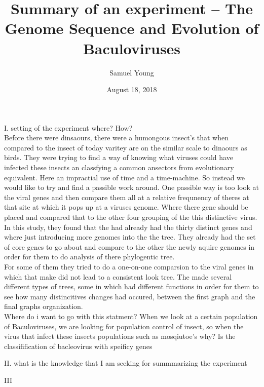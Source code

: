 \documentclass{article}[12pt,a4paper,twoside,draft]
\author{Samuel Young}
\date{August 18, 2018}
\title{Summary of an experiment -- The Genome Sequence and Evolution of Baculoviruses}
\begin{document}
\maketitle

I. setting of the experiment
   where? How?\\ 
   Before there were dinsaours, there were a humongous insect's that when compared to the insect of today varitey are on the similar scale to dinaours as birds.
   They were trying to find a way of knowing what viruses could have infected these insects an classfying a common ansectors from evolutionary equivalent.
   Here an impractial use of time and a time-machine.
   So instead we would like to try and find a passible work around. 
   One passible way is too look at the viral genes and then compare them all at a relative frequnency of theres at that site at which it pops up at a viruses genome.
   Where there gene should be placed and compared that to the other four grouping of the this distinctive virus.
   In this study, they found that the had already had the thirty distinct genes and where just introducing more genomes into the the tree.
   They already had the set of core genes to go about and compare to the other the newly aquire genomes in order for them to do analysis of there phylogentic tree.\\ 
   For some of them they tried to do a one-on-one comparsion to the viral genes in which that make did not lead to a consistent look tree.
   The made several different types of trees, some in which had different functions in order for them to see how many distincitives changes had occured, between the first graph and the final graphs organization. \\
   Where do i want to go with this statment?
   When we look at a certain population of Baculoviruses, we are looking for  population control of insect, so when the virus that infect these insects populations such as mosqiutoe's    
   why?
   Is the classifification of bacleovirus with speificy genes 

II. what is the knowledge that I am seeking for summmarizing the experiment 

III
\end{document}
